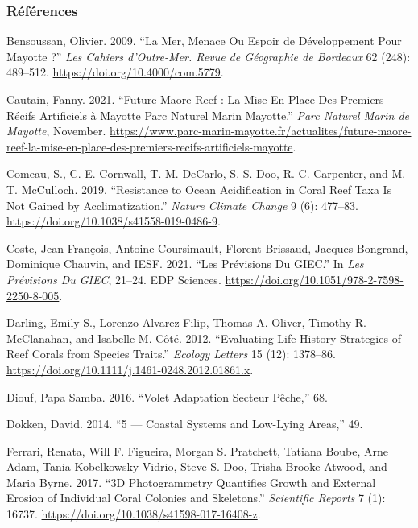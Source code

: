 \documentclass[]{article}
\begin{document}
\hypertarget{ruxe9fuxe9rences}{%
\subsubsection*{Références}\label{ruxe9fuxe9rences}}

\hypertarget{refs}{}
\leavevmode\hypertarget{ref-bensoussan_mer_2009}{}%
Bensoussan, Olivier. 2009. ``La Mer, Menace Ou Espoir de Développement
Pour Mayotte ?'' \emph{Les Cahiers d'Outre-Mer. Revue de Géographie de
Bordeaux} 62 (248): 489--512. \url{https://doi.org/10.4000/com.5779}.

\leavevmode\hypertarget{ref-cautain_future_2021}{}%
Cautain, Fanny. 2021. ``Future Maore Reef : La Mise En Place Des
Premiers Récifs Artificiels à Mayotte Parc Naturel Marin Mayotte.''
\emph{Parc Naturel Marin de Mayotte}, November.
\url{https://www.parc-marin-mayotte.fr/actualites/future-maore-reef-la-mise-en-place-des-premiers-recifs-artificiels-mayotte}.

\leavevmode\hypertarget{ref-comeau_resistance_2019}{}%
Comeau, S., C. E. Cornwall, T. M. DeCarlo, S. S. Doo, R. C. Carpenter,
and M. T. McCulloch. 2019. ``Resistance to Ocean Acidification in Coral
Reef Taxa Is Not Gained by Acclimatization.'' \emph{Nature Climate
Change} 9 (6): 477--83. \url{https://doi.org/10.1038/s41558-019-0486-9}.

\leavevmode\hypertarget{ref-coste_les_2021}{}%
Coste, Jean-François, Antoine Coursimault, Florent Brissaud, Jacques
Bongrand, Dominique Chauvin, and IESF. 2021. ``Les Prévisions Du GIEC.''
In \emph{Les Prévisions Du GIEC}, 21--24. EDP Sciences.
\url{https://doi.org/10.1051/978-2-7598-2250-8-005}.

\leavevmode\hypertarget{ref-darling_evaluating_2012}{}%
Darling, Emily S., Lorenzo Alvarez-Filip, Thomas A. Oliver, Timothy R.
McClanahan, and Isabelle M. Côté. 2012. ``Evaluating Life-History
Strategies of Reef Corals from Species Traits.'' \emph{Ecology Letters}
15 (12): 1378--86.
\url{https://doi.org/10.1111/j.1461-0248.2012.01861.x}.

\leavevmode\hypertarget{ref-diouf_volet_2016}{}%
Diouf, Papa Samba. 2016. ``Volet Adaptation Secteur Pêche,'' 68.

\leavevmode\hypertarget{ref-dokken_5_2014}{}%
Dokken, David. 2014. ``5 --- Coastal Systems and Low-Lying Areas,'' 49.

\leavevmode\hypertarget{ref-ferrari_3d_2017}{}%
Ferrari, Renata, Will F. Figueira, Morgan S. Pratchett, Tatiana Boube,
Arne Adam, Tania Kobelkowsky-Vidrio, Steve S. Doo, Trisha Brooke Atwood,
and Maria Byrne. 2017. ``3D Photogrammetry Quantifies Growth and
External Erosion of Individual Coral Colonies and Skeletons.''
\emph{Scientific Reports} 7 (1): 16737.
\url{https://doi.org/10.1038/s41598-017-16408-z}.
\end{document}
